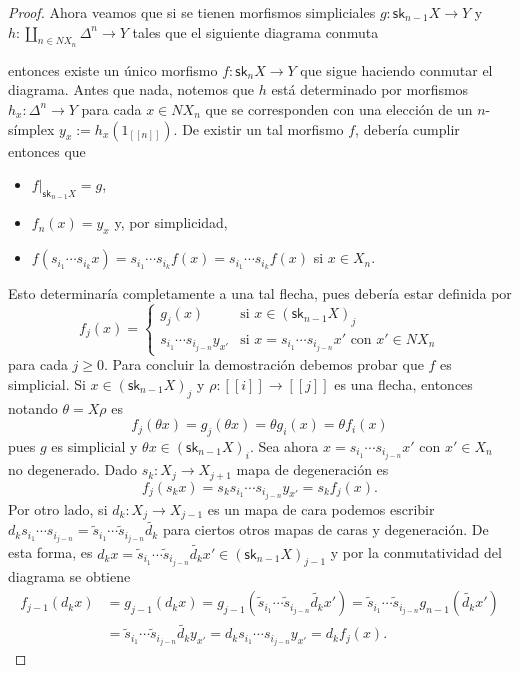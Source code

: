 \documentclass[11pt]{report}
\theoremstyle{colored}
\newcommand{\nat}[1]{[\![#1]\!]}
\newcommand{\sk}{\mathsf{sk}}
\renewcommand{\ss}[1]{\Delta^{#1}}
\begin{document}
\begin{proof}
Ahora veamos que si se tienen morfismos simpliciales $g : \sk_{n-1} X \to Y$ y $h : \coprod_{n \in NX_n} \ss{n} \to Y$ tales que el siguiente diagrama conmuta
\begin{center}
\end{center}
entonces existe un único morfismo $f : \sk_n X \to Y$ que sigue haciendo conmutar el diagrama. Antes que nada, notemos que $h$ está determinado por morfismos $h_x : \ss{n} \to Y$ para cada $x \in NX_n$ que se corresponden con una elección de un $n$-símplex $y_x := h_x(1_{\nat{n}})$. De existir un tal morfismo $f$, debería cumplir entonces que
\begin{itemize}
\item $f|_{\sk_{n-1}X} = g$,
\item $f_n(x) = y_x$ y, por simplicidad,
\item $f(s_{i_1} \cdots s_{i_k} x) = s_{i_1}\cdots s_{i_k}f(x) = s_{i_1}\cdots s_{i_k}f(x)$ si $x \in X_n$.
\end{itemize}

Esto determinaría completamente a una tal flecha, pues debería estar definida por 
\[
f_j(x) = \begin{cases}
g_j(x) &\text{si $x \in (\sk_{n-1}X)_j$}\\
s_{i_1} \cdots s_{i_{j-n}}y_{x'} &\text{si $x =s_{i_1} \cdots s_{i_{j-n}}x'$ con $x' \in NX_n$}
\end{cases}
\]
para cada $j \geq 0$. Para concluir la demostración debemos probar que $f$ es simplicial. Si $x \in (\sk_{n-1}X)_j$ y $\rho : \nat{i} \to \nat{j}$ es una flecha, entonces notando $\theta = X \rho$ es
\[
f_j(\theta x) = g_j(\theta x) = \theta g_i(x) = \theta f_i(x)
\]
pues $g$ es simplicial y $\theta x \in (\sk_{n-1}X)_i$. Sea ahora $x = s_{i_1} \cdots s_{i_{j-n}}x'$ con $x' \in X_n$ no degenerado. Dado $s_k : X_j \to X_{j+1}$ mapa de degeneración es
\[
f_j(s_kx) = s_ks_{i_1} \cdots s_{i_{j-n}}y_{x'} = s_kf_j(x).
\]
Por otro lado, si $d_k : X_j \to X_{j-1}$ es un mapa de cara podemos escribir $d_ks_{i_1} \cdots s_{i_{j-n}} = \widetilde{s}_{i_1} \cdots \widetilde{s}_{i_{j-n}}\widetilde{d_k}$ para ciertos otros mapas de caras y degeneración. De esta forma, es $d_kx = \widetilde{s}_{i_1} \cdots \widetilde{s}_{i_{j-n}}\widetilde{d_k}x' \in (\sk_{n-1}X)_{j-1}$ y por la conmutatividad del diagrama se obtiene
\begin{align*}
f_{j-1}(d_kx) &= g_{j-1}(d_kx) = g_{j-1}(\widetilde{s}_{i_1} \cdots \widetilde{s}_{i_{j-n}}\widetilde{d_k}x') = \widetilde{s}_{i_1} \cdots \widetilde{s}_{i_{j-n}}g_{n-1}(\widetilde{d_k}x')\\
&= \widetilde{s}_{i_1} \cdots \widetilde{s}_{i_{j-n}}\widetilde{d_k}y_{x'} = d_ks_{i_1} \cdots s_{i_{j-n}}y_{x'} = d_kf_j(x).
\end{align*}


\end{proof}
\end{document}
